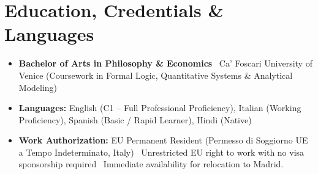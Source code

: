 \documentclass[a4paper,10pt]{article}
\begin{document}
\section{Education, Credentials \& Languages}
\begin{itemize}
  \item \textbf{Bachelor of Arts in Philosophy \& Economics} \textbullet\ Ca' Foscari University of Venice (Coursework in Formal Logic, Quantitative Systems \& Analytical Modeling)
  \item \textbf{Languages:} English (C1 -- Full Professional Proficiency), Italian (Working Proficiency), Spanish (Basic / Rapid Learner), Hindi (Native)
  \item \textbf{Work Authorization:} EU Permanent Resident (Permesso di Soggiorno UE a Tempo Indeterminato, Italy) \textbullet\ Unrestricted EU right to work with no visa sponsorship required \textbullet\ Immediate availability for relocation to Madrid.
\end{itemize}
\end{document}
